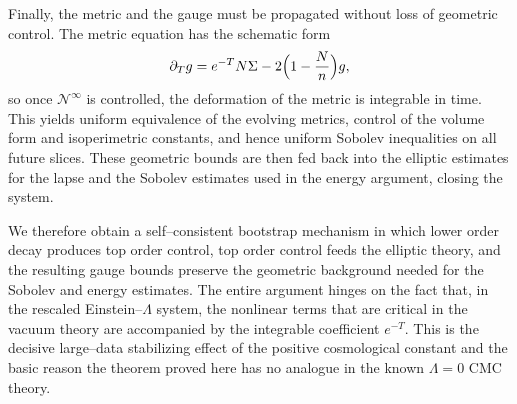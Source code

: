 \documentclass{amsart}
\begin{document}
\medskip

\noindent Finally, the metric and the gauge must be propagated without loss of geometric control.  The metric equation has the schematic form
\[
\partial_T g
 = e^{-T}N\Sigma
   -2\Bigl(1-\frac{N}{n}\Bigr)g,
\]
so once \(\mathcal N^\infty\) is controlled, the deformation of the metric is integrable in time.  This yields uniform equivalence of the evolving metrics, control of the volume form and isoperimetric constants, and hence uniform Sobolev inequalities on all future slices.  These geometric bounds are then fed back into the elliptic estimates for the lapse and the Sobolev estimates used in the energy argument, closing the system.

\medskip

\noindent We therefore obtain a self--consistent bootstrap mechanism in which lower order decay produces top order control, top order control feeds the elliptic theory, and the resulting gauge bounds preserve the geometric background needed for the Sobolev and energy estimates.  The entire argument hinges on the fact that, in the rescaled Einstein--\(\Lambda\) system, the nonlinear terms that are critical in the vacuum theory are accompanied by the integrable coefficient \(e^{-T}\).  This is the decisive large--data stabilizing effect of the positive cosmological constant and the basic reason the theorem proved here has no analogue in the known \(\Lambda=0\) CMC theory.
\end{document}
